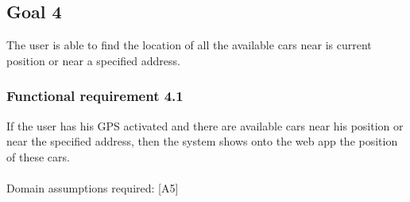\subsection{Goal 4}
The user is able to find the location of all the available cars near is current position or near a specified address.

\setcounter{secnumdepth}{3}
\subsubsection{Functional requirement 4.1}
If the user has his GPS activated and there are available cars near his position or near the specified address, then the system shows onto the web app the position of these cars.\\~\\
\noindent Domain assumptions required: [A5]
